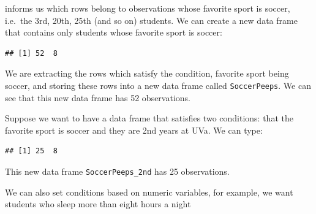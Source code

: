 \documentclass[
]{book}
\newenvironment{Shaded}{\begin{snugshade}}{\end{snugshade}}
\newcommand{\DecValTok}[1]{\textcolor[rgb]{0.00,0.00,0.81}{#1}}
\newcommand{\FunctionTok}[1]{\textcolor[rgb]{0.13,0.29,0.53}{\textbf{#1}}}
\newcommand{\NormalTok}[1]{#1}
\newcommand{\OtherTok}[1]{\textcolor[rgb]{0.56,0.35,0.01}{#1}}
\newcommand{\SpecialCharTok}[1]{\textcolor[rgb]{0.81,0.36,0.00}{\textbf{#1}}}
\newcommand{\StringTok}[1]{\textcolor[rgb]{0.31,0.60,0.02}{#1}}
\begin{document}
informs us which rows belong to observations whose favorite sport is soccer, i.e.~the 3rd, 20th, 25th (and so on) students. We can create a new data frame that contains only students whose favorite sport is soccer:

\begin{Shaded}
\end{Shaded}

\begin{verbatim}
## [1] 52  8
\end{verbatim}

We are extracting the rows which satisfy the condition, favorite sport being soccer, and storing these rows into a new data frame called \texttt{SoccerPeeps}. We can see that this new data frame has 52 observations.

Suppose we want to have a data frame that satisfies two conditions: that the favorite sport is soccer and they are 2nd years at UVa. We can type:

\begin{Shaded}
\end{Shaded}

\begin{verbatim}
## [1] 25  8
\end{verbatim}

This new data frame \texttt{SoccerPeeps\_2nd} has 25 observations.

We can also set conditions based on numeric variables, for example, we want students who sleep more than eight hours a night

\begin{Shaded}
\end{Shaded}
\end{document}
